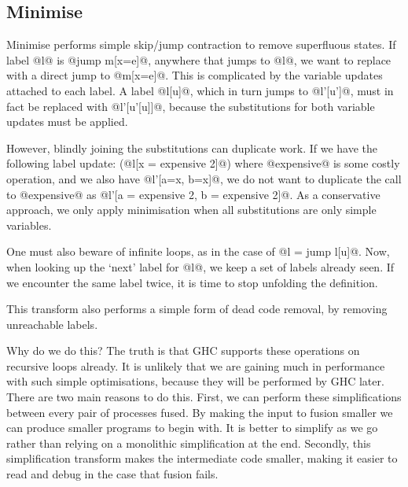 \subsection{Minimise}
Minimise performs simple skip/jump contraction to remove superfluous states.
If label @l@ is @jump m[x=e]@, anywhere that jumps to @l@, we want to replace with a direct jump to @m[x=e]@.
This is complicated by the variable updates attached to each label.
A label @l[u]@, which in turn jumps to @l'[u']@, must in fact be replaced with @l'[u'[u]]@, because the substitutions for both variable updates must be applied.

However, blindly joining the substitutions can duplicate work.
If we have the following label update: (@l[x = expensive 2]@) where @expensive@ is some costly operation, and we also have @l'[a=x, b=x]@, we do not want to duplicate the call to @expensive@ as @l'[a = expensive 2, b = expensive 2]@.
As a conservative approach, we only apply minimisation when all substitutions are only simple variables.

One must also beware of infinite loops, as in the case of @l = jump l[u]@.
Now, when looking up the `next' label for @l@, we keep a set of labels already seen.
If we encounter the same label twice, it is time to stop unfolding the definition.

This transform also performs a simple form of dead code removal, by removing unreachable labels.

Why do we do this?
The truth is that GHC supports these operations on recursive loops already.
It is unlikely that we are gaining much in performance with such simple optimisations, because they will be performed by GHC later.
There are two main reasons to do this.
First, we can perform these simplifications between every pair of processes fused.
By making the input to fusion smaller we can produce smaller programs to begin with.
It is better to simplify as we go rather than relying on a monolithic simplification at the end.
Secondly, this simplification transform makes the intermediate code smaller, making it easier to read and debug in the case that fusion fails.



